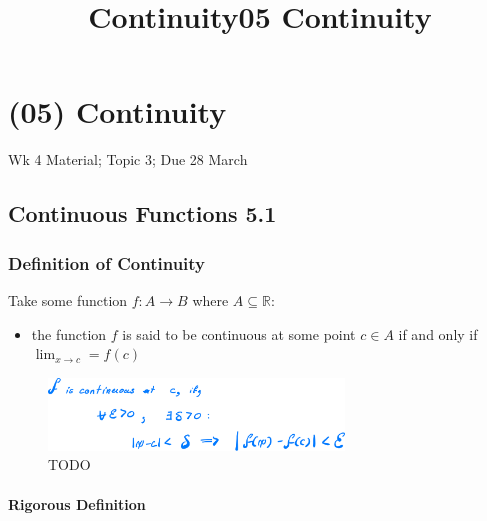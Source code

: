 \documentclass[class=article, crop=false]{standalone}
\title{Continuity}
\begin{document}

\title{05 Continuity}

\section{(05) Continuity}

Wk 4 Material; Topic 3; Due 28 March

\newpage
\subsection{Continuous Functions 5.1 }


\subsubsection{Definition of Continuity}

Take some function \(f: A \rightarrow B\) where
\(A \subseteq \mathbb{R}\):

\begin{itemize}
\item
  the function \(f\) is said to be continuous at some point \(c\in A\)
  if and only if \(\lim_{x\rightarrow c} = f(c)\)
\end{itemize}



\begin{figure}
\centering
\includegraphics[width=0.7\textwidth]{media/Continuity/5a4384a9f2a06610556cce9d4252fedc2d5050eb.png}
\caption{TODO}
\end{figure}

\paragraph{Rigorous Definition}
\end{document}
